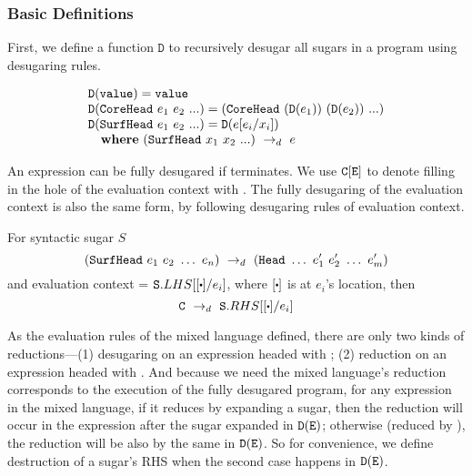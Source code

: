 


\subsubsection{Basic Definitions}
First, we define a function $\mathtt{D}$ to recursively desugar all sugars in a program using desugaring rules.

\begin{Def}
\[
\begin{array}{lll}
	\mathtt{D}(\texttt{value}) = \texttt{value}\\
	\mathtt{D}(\texttt{CoreHead}~e_1~e_2~ ...) = (\texttt{CoreHead}~(\mathtt{D}(e_1))~(\mathtt{D}(e_2))~...)\\
	\mathtt{D}(\texttt{SurfHead}~e_1~e_2~ ...) = \mathtt{D}(e[e_i/x_i])\\
\quad \mbox{\bf where}~(\texttt{SurfHead}~x_1~x_2~ ...) ~\rightarrow_d~ e

\end{array}
\]

\end{Def}


An expression  can be fully desugared if  terminates. We use $\mbox{\tt C}[\mbox{\tt E}]$ to denote filling in the hole of the evaluation context  with .  The fully desugaring of the evaluation context is also the same form, by following desugaring rules of evaluation context.

\begin{Def}
	For syntactic sugar $S$
	\[
	(\mbox{\tt SurfHead}~e_1~e_2~\ldots~e_n) ~\rightarrow_d~ (\mbox{\tt Head}~\ldots~e_1'~e_2'~\ldots~e_m')
	\]
	and evaluation context  = $\m{S}.LHS[[\bigcdot]/e_i]$, where $[\bigcdot]$ is at $e_i$'s location, then
	\[
	\drule{\m{C}}{\m{S}.RHS[[\bigcdot]/e_i]}
	\]

\end{Def}
As the evaluation rules of the mixed language defined, there are only two kinds of reductions---(1) desugaring on an expression headed with ; (2) reduction on an expression headed with . And because we need the mixed language's reduction corresponds to the execution of the fully desugared program, for any expression  in the mixed language, if it reduces by expanding a sugar, then the reduction will occur in the expression after the sugar expanded in $\mathtt{D}(\mbox{\tt E})$; otherwise (reduced by ), the reduction will be also by the same  in $\mathtt{D}(\mbox{\tt E})$.
So for convenience, we define destruction of a sugar's RHS when the second case happens in $\mathtt{D}(\mbox{\tt E})$.

